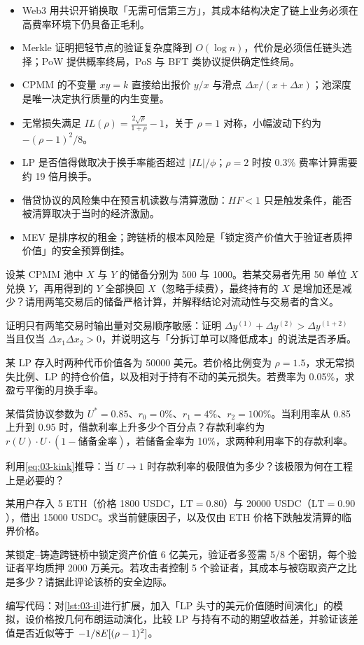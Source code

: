 \begin{summarybox}
\begin{itemize}[leftmargin=1.2em, itemsep=2pt]
  \item Web3 用共识开销换取「无需可信第三方」，其成本结构决定了链上业务必须在高费率环境下仍具备正毛利。
  \item Merkle 证明把轻节点的验证复杂度降到 $O(\log n)$，代价是必须信任链头选择；PoW 提供概率终局，PoS 与 BFT 类协议提供确定性终局。
  \item CPMM 的不变量 $xy=k$ 直接给出报价 $y/x$ 与滑点 $\Delta x/(x+\Delta x)$；池深度是唯一决定执行质量的内生变量。
  \item 无常损失满足 $IL(\rho)=\frac{2\sqrt{\rho}}{1+\rho}-1$，关于 $\rho=1$ 对称，小幅波动下约为 $-(\rho-1)^2/8$。
  \item LP 是否值得做取决于换手率能否超过 $|IL|/\phi$；$\rho=2$ 时按 0.3\% 费率计算需要约 19 倍月换手。
  \item 借贷协议的风险集中在预言机读数与清算激励：$HF<1$ 只是触发条件，能否被清算取决于当时的经济激励。
  \item MEV 是排序权的租金；跨链桥的根本风险是「锁定资产价值大于验证者质押价值」的安全预算倒挂。
\end{itemize}
\end{summarybox}

\begin{exercises}
  \item 设某 CPMM 池中 $X$ 与 $Y$ 的储备分别为 500 与 1000。若某交易者先用 50 单位 $X$ 兑换 $Y$，再用得到的 $Y$ 全部换回 $X$（忽略手续费），最终持有的 $X$ 是增加还是减少？请用两笔交易后的储备严格计算，并解释结论对流动性与交易者的含义。
  \item 证明只有两笔交易时输出量对交易顺序敏感：证明 $\Delta y^{(1)}+\Delta y^{(2)} > \Delta y^{(1+2)}$ 当且仅当 $\Delta x_1\Delta x_2>0$，并说明这与「分拆订单可以降低成本」的说法是否矛盾。
  \item 某 LP 存入时两种代币价值各为 50000 美元。若价格比例变为 $\rho=1.5$，求无常损失比例、LP 的持仓价值，以及相对于持有不动的美元损失。若费率为 0.05\%，求盈亏平衡的月换手率。
  \item 某借贷协议参数为 $U^{*}=0.85$、$r_0=0\%$、$r_1=4\%$、$r_2=100\%$。当利用率从 0.85 上升到 0.95 时，借款利率上升多少个百分点？存款利率约为 $r(U)\cdot U\cdot(1-\text{储备金率})$，若储备金率为 10\%，求两种利用率下的存款利率。
  \item 利用\cref{eq:03-kink}推导：当 $U\to 1$ 时存款利率的极限值为多少？该极限为何在工程上是必要的？
  \item 某用户存入 5 ETH（价格 1800 USDC，$\text{LT}=0.80$）与 20000 USDC（$\text{LT}=0.90$），借出 15000 USDC。求当前健康因子，以及仅由 ETH 价格下跌触发清算的临界价格。
  \item 某锁定--铸造跨链桥中锁定资产价值 6 亿美元，验证者多签需 5/8 个密钥，每个验证者平均质押 2000 万美元。若攻击者控制 5 个验证者，其成本与被窃取资产之比是多少？请据此评论该桥的安全边际。
  \item 编写代码：对\cref{lst:03-il}进行扩展，加入「LP 头寸的美元价值随时间演化」的模拟，设价格按几何布朗运动演化，比较 LP 与持有不动的期望收益差，并验证该差值是否近似等于 $-1/8E[(\rho-1)^2]$。
\end{exercises}

